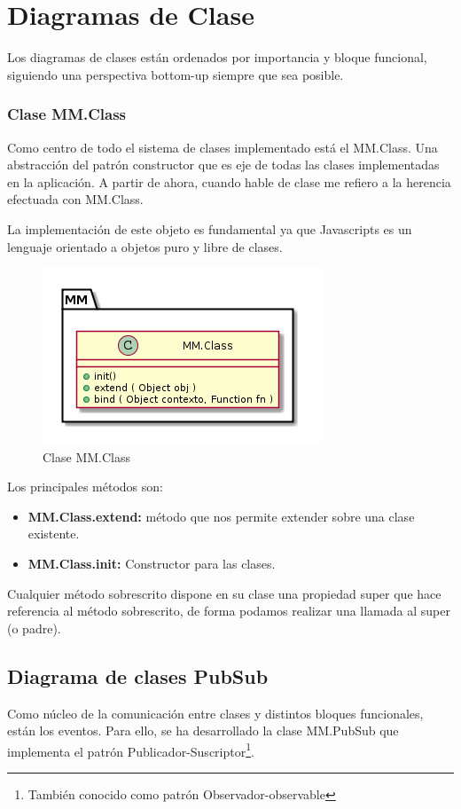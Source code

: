 \section{Diagramas de Clase}

Los diagramas de clases están ordenados por importancia y bloque funcional, siguiendo una
perspectiva bottom-up siempre que sea posible.


\subsubsection{Clase MM.Class}
Como centro de todo el sistema de clases implementado está el MM.Class. Una abstracción del 
patrón constructor que es eje de todas las clases implementadas en la aplicación. A partir 
de ahora, cuando hable de clase me refiero a la herencia efectuada con MM.Class.

La implementación de este objeto es fundamental ya que Javascripts es un lenguaje orientado 
a objetos puro y libre de clases. 

\begin{figure}[tbph]
\centering
\includegraphics[width=0.4\linewidth]{imagenes/diagrama-clase-mm-class}
\caption{Clase MM.Class}
\label{fig:diagrama-clase-mm-class}
\end{figure}
Los principales métodos son:
\begin{itemize}
\item \textbf{MM.Class.extend:} método que nos permite extender sobre una clase existente.
\item \textbf{MM.Class.init:} Constructor para las clases.
\end{itemize}

Cualquier método sobrescrito dispone en su clase una propiedad \underline{ }super que hace referencia al método sobrescrito, de forma
podamos realizar una llamada al super (o padre).


\subsection{Diagrama de clases PubSub}

Como núcleo de la comunicación entre clases y distintos bloques funcionales, están los eventos. Para ello, se ha desarrollado
la clase MM.PubSub que implementa el patrón Publicador-Suscriptor\footnote{También conocido como patrón Observador-observable}.

